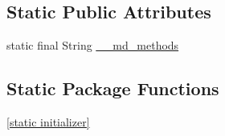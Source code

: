 \subsection*{Static Public Attributes}
\begin{CompactItemize}
\item 
static final String \hyperlink{classmd5b60ffeb829f638581ab2bb9b1a7f4f3f_1_1_forms_application_activity_37d533299315e969b66527bb86dba664}{\_\-\_\-md\_\-methods}
\end{CompactItemize}
\subsection*{Static Package Functions}
\begin{CompactItemize}
\item 
\hyperlink{classmd5b60ffeb829f638581ab2bb9b1a7f4f3f_1_1_forms_application_activity_7e80971fb4184461dc21b70a23a7e601}{\mbox{[}static initializer\mbox{]}}
\end{CompactItemize}

